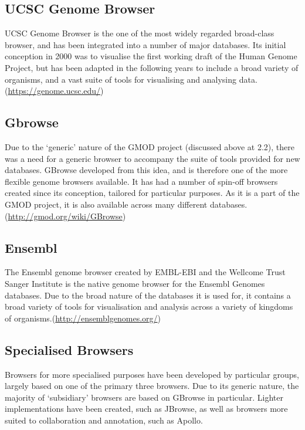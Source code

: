 \subsection{UCSC Genome Browser}
UCSC Genome Browser is the one of the most widely regarded broad-class browser, and has been integrated into a number of
major databases. Its initial conception in 2000 was to visualise the first working draft of the Human Genome Project, but has been adapted in the following years to include a broad variety of organisms, and a vast suite of tools for visualising and analysing data.(\url{https://genome.ucsc.edu/})

\subsection{Gbrowse} 
Due to the ‘generic’ nature of the GMOD project (discussed above at 2.2), there was a need for a generic browser to accompany the suite of tools provided for new databases. GBrowse developed from this idea, and is therefore one of the more flexible genome browsers available. It has had a number of spin-off browsers created since its conception, tailored for particular purposes. As it is a part of the GMOD project, it is also available across many different databases\cite{ranganathan2018encyclopedia}. (\url{http://gmod.org/wiki/GBrowse})

\subsection{Ensembl} 
The Ensembl genome browser created by EMBL-EBI and the Wellcome Trust Sanger Institute is the native genome browser for the
Ensembl Genomes databases. Due to the broad nature of the databases it is used for, it contains a broad variety of tools for visualisation and analysis across a variety of kingdoms of organisms.(\url{http://ensemblgenomes.org/})

\subsection{Specialised Browsers}
Browsers for more specialised purposes have been developed by particular groups, largely based on one of the primary three
browsers. Due to its generic nature, the majority of ‘subsidiary’ browsers are based on GBrowse in particular. Lighter implementations have been created, such as JBrowse, as well as browsers more suited to collaboration and annotation, such as Apollo.


